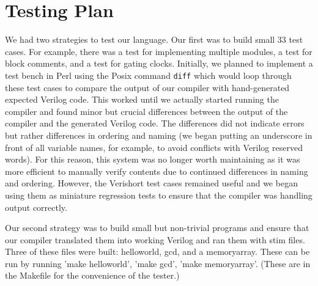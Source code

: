 \documentclass[letterpaper,11pt]{article}
\begin{document}
\section{Testing Plan}
We had two strategies to test our language.  Our first was to build small 33 test cases.  For example, there was a test for implementing multiple modules, a test for block comments, and a test for gating clocks.  Initially, we planned to implement a test bench in Perl using the Posix command \texttt{diff} which would loop through these test cases to compare the output of our compiler with hand-generated expected Verilog code.  This worked until we actually started running the compiler and found minor but crucial differences between the output of the compiler and the generated Verilog code.  The differences did not indicate errors but rather differences in ordering and naming (we began putting an underscore in front of all variable names, for example, to avoid conflicts with Verilog reserved words).  For this reason,  this system was no longer worth maintaining as it was more efficient to manually verify contents due to continued differences in naming and ordering.  However, the Verishort test cases remained useful and we began using them as miniature regression tests to ensure that the compiler was handling output correctly.

Our second strategy was to build small but non-trivial programs and ensure that our compiler translated them into working Verilog and ran them with stim files.  Three of these files were built: helloworld, gcd, and a memoryarray.  These can be run by running 'make helloworld', 'make gcd', 'make memoryarray'.  (These are in the Makefile for the convenience of the tester.)
    
\end{document}
